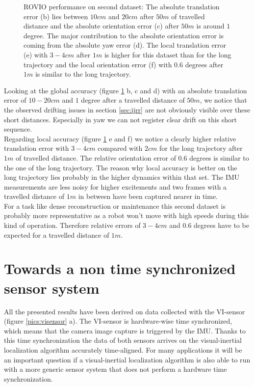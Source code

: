 \begin{figure}[h]
\begin{subfigure}[b]{0.45\textwidth}
    \caption{}
  \end{subfigure}
   \caption{ROVIO performance on second dataset: The absolute translation error (b) lies between $10cm$ and $20cm$ after $50m$ of travelled distance and the absolute orientation error (c) after $50m$ is around $1$ degree. The major contribution to the absolute orientation error is coming from the absolute yaw error (d). The local translation error (e) with $3-4cm$ after $1m$ is higher for this dataset than for the long trajectory and the local orientation error (f) with $0.6$ degrees after $1m$ is similar to the long trajectory.}
   \label{pics:euroc}
\end{figure}

Looking at the global accuracy (figure \ref{pics:euroc} b, c and d) with an absolute translation error of $10-20cm$ and $1$ degree after a travelled distance of $50m$, we notice that the observed drifting issues in section \ref{sec:ijrr} are not obviously visible over these short distances. Especially in yaw we can not register clear drift on this short sequence. \\

Regarding local accuracy (figure \ref{pics:euroc} e and f) we notice a clearly higher relative translation error with $3-4cm$ compared with $2cm$ for the long trajectory after $1m$ of travelled distance. The relative orientation error of $0.6$ degrees is similar to the one of the long trajectory. The reason why local accuracy is better on the long trajectory lies probably in the higher dynamics within that set. The IMU measurements are less noisy for higher excitements and two frames with a travelled distance of $1m$ in between have been captured nearer in time. \\

For a task like dense reconstruction or maintenance this second dataset is probably more representative as a robot won't move with high speeds during this kind of operation. Therefore relative errors of $3-4cm$ and $0.6$ degrees have to be expected for a travelled distance of $1m$.

\section{Towards a non time synchronized sensor system}
\label{sec:timesync}

All the presented results have been derived on data collected with the VI-sensor (figure \ref{pics:visensor} a). The VI-sensor is hardware-wise time synchronized, which means that the camera image capture is triggered by the IMU. Thanks to this time synchronization the data of both sensors arrives on the visual-inertial localization algorithm accurately time-aligned. For many applications it will be an important question if a visual-inertial localization algorithm is also able to run with a more generic sensor system that does not perform a hardware time synchronization. \\

